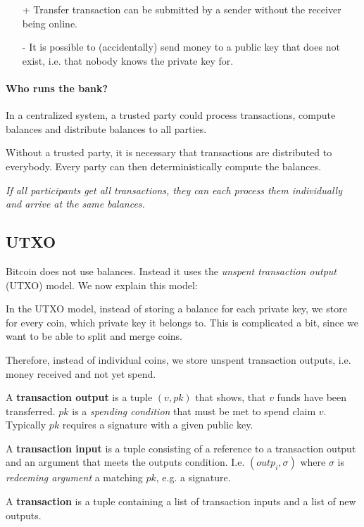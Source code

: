 
\begin{note}
\begin{itemize}
	\item[+] Transfer transaction can be submitted by a sender without the receiver being online.
	\item[-] It is possible to (accidentally) send money to a public key that does not exist, i.e. that nobody knows the private key for. 
\end{itemize}
\end{note}

\paragraph{Who runs the bank?}
In a centralized system, a trusted party could process transactions, compute balances and distribute balances to all parties. 

Without a trusted party, it is necessary that transactions are distributed to everybody. Every party can then deterministically compute the balances.

\emph{If all participants get all transactions, they can each process them individually and arrive at the same balances.}


\subsection{UTXO}
Bitcoin does not use balances. Instead it uses the 
\emph{unspent transaction output} (UTXO) model. We now explain this model:

\begin{idea}[UTXO]
In the UTXO model, instead of storing a balance for each private key, we store for every coin, which private key it belongs to. 
This is complicated a bit, since we want to be able to split and merge coins.

Therefore, instead of individual coins, we store unspent transaction outputs, i.e. money received and not yet spend.
\end{idea}

\begin{definition}
	A \textbf{transaction output} is a tuple $(v, pk)$ that shows, that $v$ funds have been transferred. $pk$ is a \emph{spending condition} that must be met to spend claim $v$. Typically $pk$ requires a signature with a given public key.
	
	A \textbf{transaction input} is a tuple consisting of a reference to a transaction output and an argument that meets the outputs condition.
	I.e. $(outp_i,\sigma)$ where $\sigma$ is \emph{redeeming argument} a matching $pk$, e.g. a signature.
	
	A \textbf{transaction} is a tuple containing a list of transaction inputs and a list of new outputs.
\end{definition}


